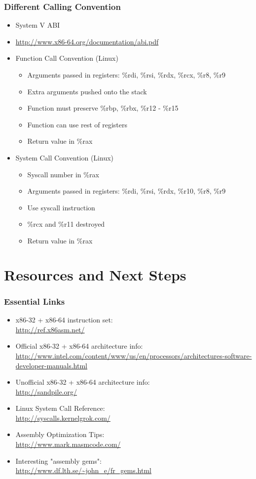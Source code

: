 \documentclass[11pt,xcolor=dvipsnames]{beamer}
\begin{document}
\begin{frame}[fragile,t]
\frametitle{Different Calling Convention}
\begin{itemize}
  \item System V ABI
  \item \url{http://www.x86-64.org/documentation/abi.pdf}
  \item Function Call Convention (Linux)
  \begin{itemize}
    \item Arguments passed in registers: {\ttfamily \%rdi, \%rsi, \%rdx, \%rcx, \%r8, \%r9}
    \item Extra arguments pushed onto the stack
    \item Function must preserve {\ttfamily \%rbp, \%rbx, \%r12 - \%r15}
    \item Function can use rest of registers
    \item Return value in {\%rax}
  \end{itemize}
  \item System Call Convention (Linux)
  \begin{itemize}
    \item Syscall number in {\ttfamily \%rax}
    \item Arguments passed in registers: {\ttfamily \%rdi, \%rsi, \%rdx, \%r10, \%r8, \%r9}
    \item Use {\ttfamily syscall} instruction
    \item {\ttfamily \%rcx} and {\ttfamily \%r11} destroyed
    \item Return value in {\%rax}
  \end{itemize}
\end{itemize}
\end{frame}

\section{Resources and Next Steps}

\begin{frame}[fragile,t]
\frametitle{Essential Links}
\begin{itemize}
  \item x86-32 + x86-64 instruction set: \\ \url{http://ref.x86asm.net/}
  \item Official x86-32 + x86-64 architecture info: \\ \url{http://www.intel.com/content/www/us/en/processors/architectures-software-developer-manuals.html}
  \item Unofficial x86-32 + x86-64 architecture info: \\ \url{http://sandpile.org/}
  \item Linux System Call Reference: \\ \url{http://syscalls.kernelgrok.com/}
  \item Assembly Optimization Tips: \\ \url{http://www.mark.masmcode.com/}
  \item Interesting "assembly gems": \\ \url{http://www.df.lth.se/~john\_e/fr\_gems.html}
\end{itemize}
\end{frame}
\end{document}
